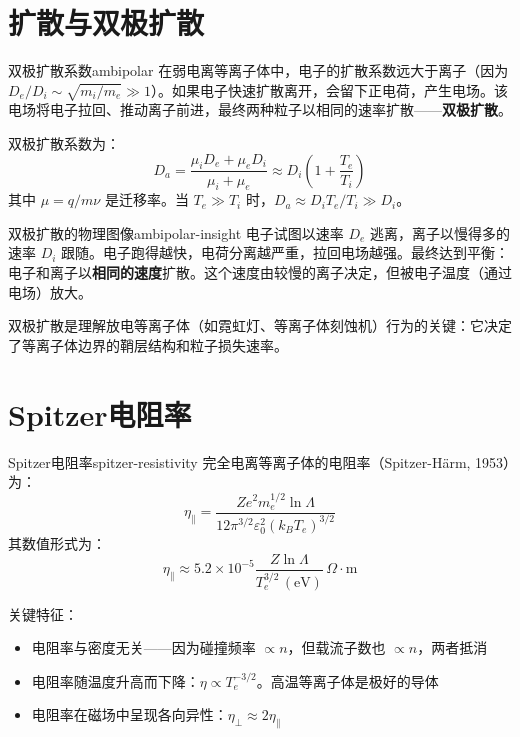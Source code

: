 \documentclass[12pt,a4paper,openany,oneside]{book}
\newcommand{\eps}{\varepsilon}
\newcommand{\difficulty}[1]{\marginnote{\hfill\textcolor{coverMid!80}{\rule[-0.1em]{2pt}{0.9em}}\,\textcolor{coverMid}{\footnotesize\textbf{[#1]}}}}
\begin{document}
\section{扩散与双极扩散}\difficulty{基础}

\begin{theorem}{双极扩散系数}{ambipolar}
在弱电离等离子体中，电子的扩散系数远大于离子（因为 $D_e/D_i \sim \sqrt{m_i/m_e} \gg 1$）。如果电子快速扩散离开，会留下正电荷，产生电场。该电场将电子拉回、推动离子前进，最终两种粒子以相同的速率扩散——\textbf{双极扩散}。

双极扩散系数为：
\[
D_a = \frac{\mu_i D_e + \mu_e D_i}{\mu_i + \mu_e} \approx D_i\left(1 + \frac{T_e}{T_i}\right)
\]
其中 $\mu = q/m\nu$ 是迁移率。当 $T_e \gg T_i$ 时，$D_a \approx D_i T_e/T_i \gg D_i$。
\end{theorem}

\begin{insight}{双极扩散的物理图像}{ambipolar-insight}
电子试图以速率 $D_e$ 逃离，离子以慢得多的速率 $D_i$ 跟随。电子跑得越快，电荷分离越严重，拉回电场越强。最终达到平衡：电子和离子以\textbf{相同的速度}扩散。这个速度由较慢的离子决定，但被电子温度（通过电场）放大。

双极扩散是理解放电等离子体（如霓虹灯、等离子体刻蚀机）行为的关键：它决定了等离子体边界的鞘层结构和粒子损失速率。
\end{insight}

\section{Spitzer电阻率}\difficulty{提高}

\begin{theorem}{Spitzer电阻率}{spitzer-resistivity}
完全电离等离子体的电阻率（Spitzer-H\"arm, 1953）为：
\[
\eta_{\parallel} = \frac{Ze^2 m_e^{1/2} \ln\Lambda}{12\pi^{3/2}\eps_0^2 (k_B T_e)^{3/2}}
\]
其数值形式为：
\[
\eta_{\parallel} \approx 5.2\times 10^{-5} \frac{Z \ln\Lambda}{T_e^{3/2}\,\mathrm{(eV)}}\,\Omega\cdot\mathrm{m}
\]

关键特征：
\begin{itemize}
\item 电阻率与密度无关——因为碰撞频率 $\propto n$，但载流子数也 $\propto n$，两者抵消
\item 电阻率随温度升高而下降：$\eta \propto T_e^{-3/2}$。高温等离子体是极好的导体
\item 电阻率在磁场中呈现各向异性：$\eta_\perp \approx 2\eta_\parallel$
\end{itemize}
\end{theorem}
\end{document}
